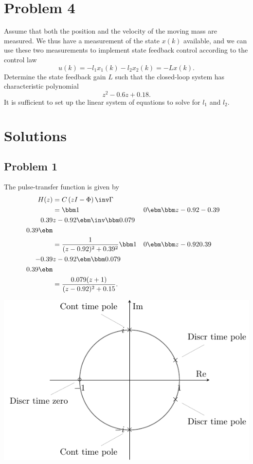 \documentclass{scrartcl}
\begin{document}
\section*{Problem 4}
\label{sec:orgheadline4}
Assume that both the position and the velocity of the moving mass are measured. We thus have a measurement of the state \(x(k)\) available, and we can use these two measurements to implement state feedback control according to the control law
\begin{equation}
u(k) = -l_1x_1(k) - l_2x_2(k) = -Lx(k).
\end{equation}
Determine the state feedback gain \(L\) such that the closed-loop system has characteristic polynomial
\begin{equation}
z^2 - 0.6z + 0.18.
\end{equation}
It is sufficient to set up the linear system of equations to solve for \(l_1\) and \(l_2\). 

\section*{Solutions}
\label{sec:orgheadline9}
\subsection*{Problem 1}
\label{sec:orgheadline5}
The pulse-transfer function is given by
\begin{equation*}
\begin{split}
H(z) &= C\left(zI - \Phi\right)\inv \Gamma\\
     &= \bbm 1 & 0 \ebm \bbm z-0.92 & -0.39\\0.39 & z-0.92 \ebm\inv \bbm 0.079\\0.39 \ebm\\
     &= \frac{1}{(z-0.92)^2 + 0.39^2}\bbm 1 & 0 \ebm \bbm z-0.92 & 0.39\\-0.39 & z-0.92 \ebm \bbm 0.079\\0.39\ebm \\
     &= \frac{0.079(z+1)}{(z-0.92)^2 + 0.15}.
\end{split}
\end{equation*}
\begin{center}
\includegraphics[]{complex-plane-sol}
\end{center}
\end{document}

